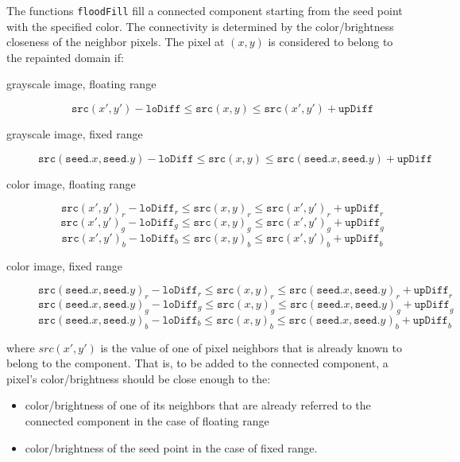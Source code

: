The functions \texttt{floodFill} fill a connected component starting from the seed point with the specified color. The connectivity is determined by the color/brightness closeness of the neighbor pixels. The pixel at $(x,y)$ is considered to belong to the repainted domain if:

\begin{description}

\item[grayscale image, floating range] \[
\texttt{src}(x',y')-\texttt{loDiff} \leq \texttt{src}(x,y) \leq \texttt{src}(x',y')+\texttt{upDiff} \]

\item[grayscale image, fixed range] \[
\texttt{src}(\texttt{seed}.x,\texttt{seed}.y)-\texttt{loDiff}\leq \texttt{src}(x,y) \leq \texttt{src}(\texttt{seed}.x,\texttt{seed}.y)+\texttt{upDiff} \]

\item[color image, floating range]
\[ \texttt{src}(x',y')_r-\texttt{loDiff}_r\leq \texttt{src}(x,y)_r\leq \texttt{src}(x',y')_r+\texttt{upDiff}_r \]
\[ \texttt{src}(x',y')_g-\texttt{loDiff}_g\leq \texttt{src}(x,y)_g\leq \texttt{src}(x',y')_g+\texttt{upDiff}_g \]
\[ \texttt{src}(x',y')_b-\texttt{loDiff}_b\leq \texttt{src}(x,y)_b\leq \texttt{src}(x',y')_b+\texttt{upDiff}_b \]

\item[color image, fixed range]
\[ \texttt{src}(\texttt{seed}.x,\texttt{seed}.y)_r-\texttt{loDiff}_r\leq \texttt{src}(x,y)_r\leq \texttt{src}(\texttt{seed}.x,\texttt{seed}.y)_r+\texttt{upDiff}_r \]
\[ \texttt{src}(\texttt{seed}.x,\texttt{seed}.y)_g-\texttt{loDiff}_g\leq \texttt{src}(x,y)_g\leq \texttt{src}(\texttt{seed}.x,\texttt{seed}.y)_g+\texttt{upDiff}_g \]
\[ \texttt{src}(\texttt{seed}.x,\texttt{seed}.y)_b-\texttt{loDiff}_b\leq \texttt{src}(x,y)_b\leq \texttt{src}(\texttt{seed}.x,\texttt{seed}.y)_b+\texttt{upDiff}_b \]
\end{description}

where $src(x',y')$ is the value of one of pixel neighbors that is already known to belong to the component. That is, to be added to the connected component, a pixel's color/brightness should be close enough to the:
\begin{itemize}
  \item color/brightness of one of its neighbors that are already referred to the connected component in the case of floating range
  \item color/brightness of the seed point in the case of fixed range.
\end{itemize}

